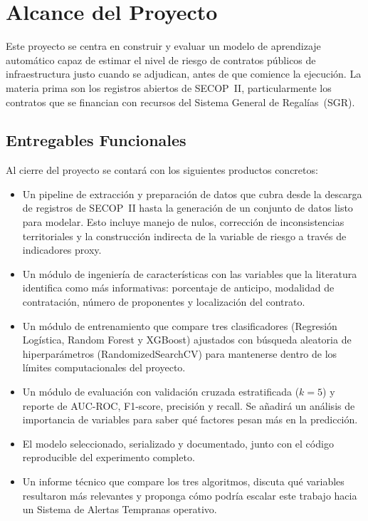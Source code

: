 \section{Alcance del Proyecto}

Este proyecto se centra en construir y evaluar un modelo de aprendizaje automático
capaz de estimar el nivel de riesgo de contratos públicos de infraestructura justo
cuando se adjudican, antes de que comience la ejecución. La materia prima son los
registros abiertos de SECOP~II, particularmente los contratos que se financian con
recursos del Sistema General de Regalías~(SGR).

\subsection{Entregables Funcionales}

Al cierre del proyecto se contará con los siguientes productos concretos:

\begin{itemize}
    \item Un pipeline de extracción y preparación de datos que cubra desde
    la descarga de registros de SECOP~II hasta la generación de un conjunto de datos
    listo para modelar. Esto incluye manejo de nulos, corrección de inconsistencias
    territoriales y la construcción indirecta de la variable de riesgo a través de
    indicadores proxy.

    \item Un módulo de ingeniería de características con las variables que la
    literatura identifica como más informativas: porcentaje de anticipo, modalidad
    de contratación, número de proponentes y localización del contrato.

    \item Un módulo de entrenamiento que compare tres clasificadores (Regresión
    Logística, Random Forest y XGBoost) ajustados con búsqueda aleatoria de
    hiperparámetros (RandomizedSearchCV) para mantenerse dentro de los
    límites computacionales del proyecto.

    \item Un módulo de evaluación con validación cruzada estratificada ($k = 5$) y
    reporte de AUC-ROC, F1-score, precisión y recall. Se añadirá un análisis
    de importancia de variables para saber qué factores pesan más en la predicción.

    \item El modelo seleccionado, serializado y documentado, junto con el código
    reproducible del experimento completo.

    \item Un informe técnico que compare los tres algoritmos, discuta qué variables
    resultaron más relevantes y proponga cómo podría escalar este trabajo hacia un
    Sistema de Alertas Tempranas operativo.
\end{itemize}

